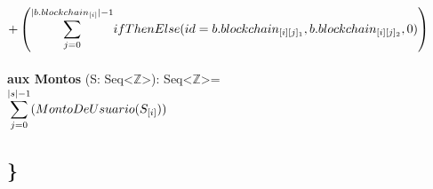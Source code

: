 \documentclass{article}
\begin{document}
        \indent\indent\indent\indent\indent\indent
        $+\left( \mathlarger\sum\limits_{j=0}^{|b.blockchain_{[i]}|-1} ifThenElse (id = b.blockchain_{[i][j]_1}, b.blockchain_{[i][j]_2}, 0)
        \right)$\\\\

    \textbf{aux Montos} (S: Seq\textless$\mathds{Z}$\textgreater): Seq\textless$\mathds{Z}$\textgreater = \\

        \indent\indent $\mathlarger\sum\limits_{j=0}^{|s|-1} (MontoDeUsuario(S_{[i]}))$


\subsection*{\}}
\end{document}
